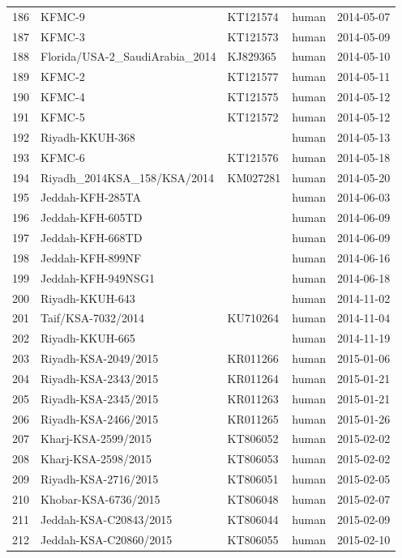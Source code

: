 \documentclass[11pt,oneside,letterpaper]{article}
\begin{document}
\begin{longtable}{ | r | l | p{2cm} | l | l | }
  186 & KFMC-9 & KT121574 & human & 2014-05-07 \\
  187 & KFMC-3 & KT121573 & human & 2014-05-09 \\
  188 & Florida/USA-2\_SaudiArabia\_2014 & KJ829365 & human & 2014-05-10 \\
  189 & KFMC-2 & KT121577 & human & 2014-05-11 \\
  190 & KFMC-4 & KT121575 & human & 2014-05-12 \\
  191 & KFMC-5 & KT121572 & human & 2014-05-12 \\
  192 & Riyadh-KKUH-368 &  & human & 2014-05-13 \\
  193 & KFMC-6 & KT121576 & human & 2014-05-18 \\
  194 & Riyadh\_2014KSA\_158/KSA/2014 & KM027281 & human & 2014-05-20 \\
  195 & Jeddah-KFH-285TA &  & human & 2014-06-03 \\
  196 & Jeddah-KFH-605TD &  & human & 2014-06-09 \\
  197 & Jeddah-KFH-668TD &  & human & 2014-06-09 \\
  198 & Jeddah-KFH-899NF &  & human & 2014-06-16 \\
  199 & Jeddah-KFH-949NSG1 &  & human & 2014-06-18 \\
  200 & Riyadh-KKUH-643 &  & human & 2014-11-02 \\
  201 & Taif/KSA-7032/2014 & KU710264 & human & 2014-11-04 \\
  202 & Riyadh-KKUH-665 &  & human & 2014-11-19 \\
  203 & Riyadh-KSA-2049/2015 & KR011266 & human & 2015-01-06 \\
  204 & Riyadh-KSA-2343/2015 & KR011264 & human & 2015-01-21 \\
  205 & Riyadh-KSA-2345/2015 & KR011263 & human & 2015-01-21 \\
  206 & Riyadh-KSA-2466/2015 & KR011265 & human & 2015-01-26 \\
  207 & Kharj-KSA-2599/2015 & KT806052 & human & 2015-02-02 \\
  208 & Kharj-KSA-2598/2015 & KT806053 & human & 2015-02-02 \\
  209 & Riyadh-KSA-2716/2015 & KT806051 & human & 2015-02-05 \\
  210 & Khobar-KSA-6736/2015 & KT806048 & human & 2015-02-07 \\
  211 & Jeddah-KSA-C20843/2015 & KT806044 & human & 2015-02-09 \\
  212 & Jeddah-KSA-C20860/2015 & KT806055 & human & 2015-02-10 \\

\end{longtable}
\end{document}
